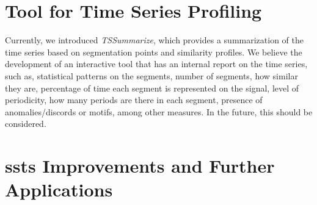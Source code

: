 \section{Tool for Time Series Profiling}

Currently, we introduced \textit{TSSummarize}, which provides a summarization of the time series based on segmentation points and similarity profiles. We believe the development of an interactive tool that has an internal report on the time series, such as, statistical patterns on the segments, number of segments, how similar they are, percentage of time each segment is represented on the signal, level of periodicity, how many periods are there in each segment, presence of anomalies/discords or motifs, among other measures. In the future, this should be considered.

\section{\gls{ssts} Improvements and Further Applications}

